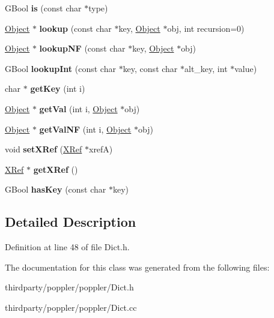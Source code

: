 \begin{DoxyCompactItemize}
G\+Bool {\bfseries is} (const char $\ast$type)
\item 
\mbox{\label{class_dict_ad50d0f13247d2126413d5856ff636ce8}} 
\hyperlink{class_object}{Object} $\ast$ {\bfseries lookup} (const char $\ast$key, \hyperlink{class_object}{Object} $\ast$obj, int recursion=0)
\item 
\mbox{\label{class_dict_aa0020b0d5a6ed5bb4a3125f83089a270}} 
\hyperlink{class_object}{Object} $\ast$ {\bfseries lookup\+NF} (const char $\ast$key, \hyperlink{class_object}{Object} $\ast$obj)
\item 
\mbox{\label{class_dict_aec5be0a39e42f30b613b93b76eb6467f}} 
G\+Bool {\bfseries lookup\+Int} (const char $\ast$key, const char $\ast$alt\+\_\+key, int $\ast$value)
\item 
\mbox{\label{class_dict_a25329e6b6bf6547e179c6f19c3b8ac40}} 
char $\ast$ {\bfseries get\+Key} (int i)
\item 
\mbox{\label{class_dict_ab452dacac7e7362bd61bc52bdb226705}} 
\hyperlink{class_object}{Object} $\ast$ {\bfseries get\+Val} (int i, \hyperlink{class_object}{Object} $\ast$obj)
\item 
\mbox{\label{class_dict_ae46235176b2591d1a4bd34b17566b421}} 
\hyperlink{class_object}{Object} $\ast$ {\bfseries get\+Val\+NF} (int i, \hyperlink{class_object}{Object} $\ast$obj)
\item 
\mbox{\label{class_dict_ae870ad3a022dbfcb1a9b61f544642a3d}} 
void {\bfseries set\+X\+Ref} (\hyperlink{class_x_ref}{X\+Ref} $\ast$xrefA)
\item 
\mbox{\label{class_dict_a1784cb555dd5ac89cce09032e71568e0}} 
\hyperlink{class_x_ref}{X\+Ref} $\ast$ {\bfseries get\+X\+Ref} ()
\item 
\mbox{\label{class_dict_a153cdf50dbfa5023a50a29478f1db38a}} 
G\+Bool {\bfseries has\+Key} (const char $\ast$key)
\end{DoxyCompactItemize}


\subsection{Detailed Description}


Definition at line 48 of file Dict.\+h.



The documentation for this class was generated from the following files\+:\begin{DoxyCompactItemize}
\item 
thirdparty/poppler/poppler/Dict.\+h\item 
thirdparty/poppler/poppler/Dict.\+cc\end{DoxyCompactItemize}
